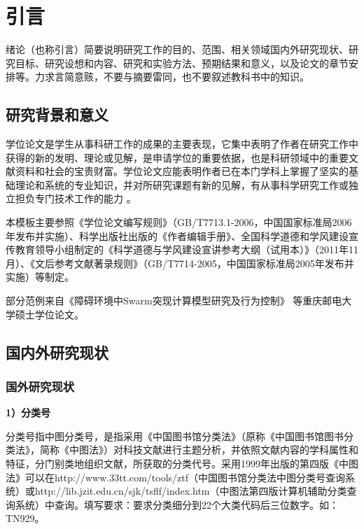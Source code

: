 
\chapter{引言}
绪论（也称引言）简要说明研究工作的目的、范围、相关领域国内外研究现状、研究目标、研究设想和内容、研究和实验方法、预期结果和意义，以及论文的章节安排等。力求言简意赅，不要与摘要雷同，也不要叙述教科书中的知识。
\section{研究背景和意义}
学位论文是学生从事科研工作的成果的主要表现，它集中表明了作者在研究工作中获得的新的发明、理论或见解，是申请学位的重要依据，也是科研领域中的重要文献资料和社会的宝贵财富。学位论文应能表明作者已在本门学科上掌握了坚实的基础理论和系统的专业知识，并对所研究课题有新的见解，有从事科学研究工作或独立担负专门技术工作的能力 。

本模板主要参照《学位论文编写规则》（GB/T7713.1-2006，中国国家标准局2006年发布并实施）、科学出版社出版的《作者编辑手册》、全国科学道德和学风建设宣传教育领导小组制定的《科学道德与学风建设宣讲参考大纲（试用本）》（2011年11月）、《文后参考文献著录规则》（GB/T7714-2005，中国国家标准局2005年发布并实施）等制定。

部分范例来自《障碍环境中Swarm突现计算模型研究及行为控制》 等重庆邮电大学硕士学位论文。


\section{国内外研究现状}
\subsection{国外研究现状}
\textbf{1）分类号}

分类号指中图分类号，是指采用《中国图书馆分类法》（原称《中国图书馆图书分类法》，简称《中图法》）对科技文献进行主题分析，并依照文献内容的学科属性和特征，分门别类地组织文献，所获取的分类代号。采用1999年出版的第四版《中图法》可以在http://www.33tt.com/tools/ztf（中国图书馆分类法中图分类号查询系统）或http://lib.jzit.edu.cn/sjk/tsflf/index.htm（中图法第四版计算机辅助分类查询系统）中查询。填写要求：要求分类细分到22个大类代码后三位数字。如：TN929。

